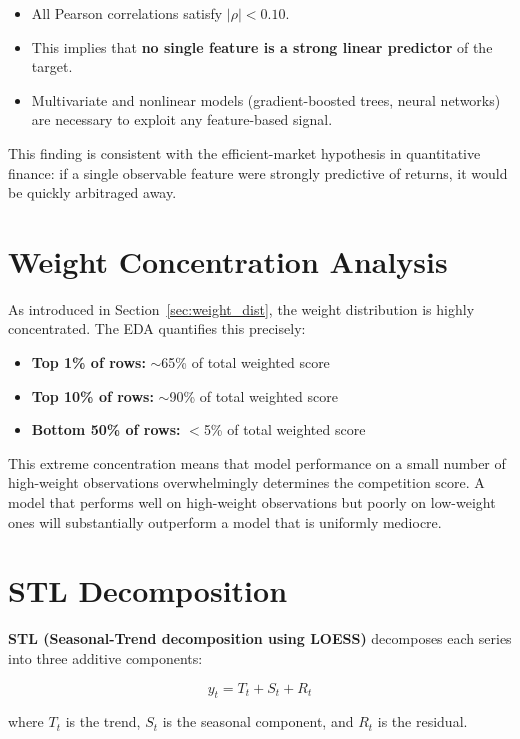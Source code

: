 \begin{itemize}
    \item All Pearson correlations satisfy $|\rho| < 0.10$.
    \item This implies that \textbf{no single feature is a strong linear predictor} of the target.
    \item Multivariate and nonlinear models (gradient-boosted trees, neural networks) are necessary to exploit any feature-based signal.
\end{itemize}

This finding is consistent with the efficient-market hypothesis in quantitative finance: if a single observable feature were strongly predictive of returns, it would be quickly arbitraged away.

\section{Weight Concentration Analysis}

As introduced in Section~\ref{sec:weight_dist}, the weight distribution is highly concentrated. The EDA quantifies this precisely:

\begin{itemize}
    \item \textbf{Top 1\% of rows:} $\sim$65\% of total weighted score
    \item \textbf{Top 10\% of rows:} $\sim$90\% of total weighted score
    \item \textbf{Bottom 50\% of rows:} $<$5\% of total weighted score
\end{itemize}

This extreme concentration means that model performance on a small number of high-weight observations overwhelmingly determines the competition score. A model that performs well on high-weight observations but poorly on low-weight ones will substantially outperform a model that is uniformly mediocre.

\section{STL Decomposition}

\textbf{STL (Seasonal-Trend decomposition using LOESS)} decomposes each series into three additive components:

\begin{equation}
y_t = T_t + S_t + R_t
\end{equation}

where $T_t$ is the trend, $S_t$ is the seasonal component, and $R_t$ is the residual.

